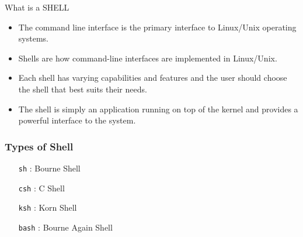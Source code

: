 \documentclass[10pt,t]{beamer}
\newcommand*\vardiamond{\textcolor{lubrown}{%
  \ensuremath{\blacklozenge}}}
\begin{document}
\begin{frame}[allowframebreaks]
\begin{exampleblock}{What is a SHELL}
    \begin{itemize}
      \item The command line interface is the primary interface to Linux/Unix operating systems.
      \item Shells are how command-line interfaces are implemented in Linux/Unix.
      \item Each shell has varying capabilities and features and the user should choose the shell that best suits their needs.
      \item The shell is simply an application running on top of the kernel and provides a powerful interface to the system.
    \end{itemize}
  \end{exampleblock}
\end{frame}

\begin{frame}
  \frametitle{Types of Shell}
    \begin{itemize}
      \item[\texttt{sh}]: Bourne Shell
      \item[\texttt{csh}]: C Shell
      \item[\texttt{ksh}]: Korn Shell
      \item[\texttt{bash}]: Bourne Again Shell
\end{itemize}
\end{frame}
\end{document}
